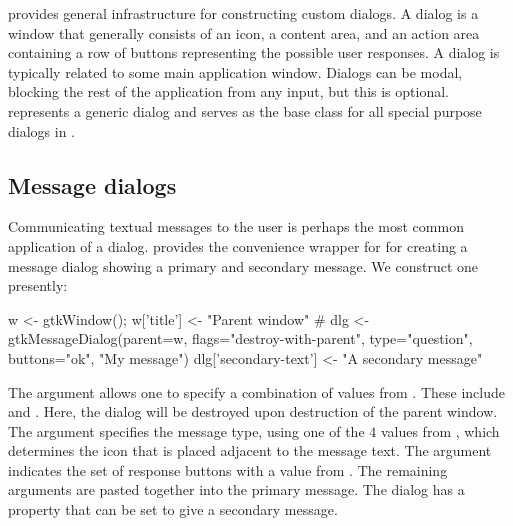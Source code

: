 
\GTK\/ provides general infrastructure for constructing custom
dialogs.  A dialog is a window that generally consists of an icon, a
content area, and an action area containing a row of buttons
representing the possible user responses.  A dialog is typically
related to some main application window. Dialogs can be modal,
blocking the rest of the application from any input, but this is
optional.   represents a generic dialog and serves as
the base class for all special purpose dialogs in \GTK.

\subsection{Message dialogs}

Communicating textual messages to the user is perhaps the most common
application of a dialog. \GTK\/ provides the
 convenience wrapper for
 for creating a message dialog showing a primary and
secondary message.  We construct one presently:
\begin{Schunk}
\begin{Sinput}
 w <- gtkWindow(); w['title'] <- "Parent window"
 #
 dlg <- gtkMessageDialog(parent=w, 
                         flags="destroy-with-parent",
                         type="question", 
                         buttons="ok",
                         "My message")
 dlg['secondary-text'] <- "A secondary message"
\end{Sinput}
\end{Schunk}
%

The  argument allows one to specify
a combination of values from . These include 
 and . Here, the dialog will be
destroyed upon destruction of the parent window. The
 argument specifies the message type,
using one of the $4$ values from , which determines the icon that
is placed adjacent to the message text. The
 argument indicates the set of
response buttons with a value from . The
remaining arguments are pasted together into the primary message.  The
dialog has a  property that can be set to give a
secondary message.

